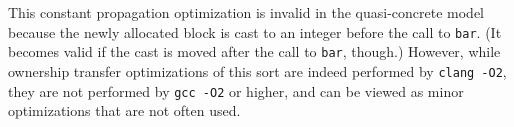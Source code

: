 This constant propagation optimization is invalid in the
quasi-concrete model because the newly allocated block is cast to an
integer before the call to \texttt{bar}.  (It becomes valid if the
cast is moved after the call to \texttt{bar}, though.)  However, while
ownership transfer optimizations of this sort are indeed performed by
\texttt{clang -O2}, they are not performed by \texttt{gcc -O2} or
higher, and can be viewed as minor optimizations that are not often
used.









